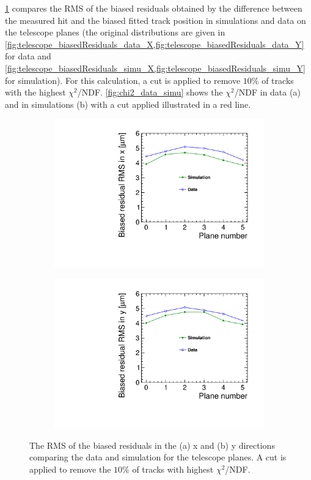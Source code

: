 \cref{fig:telescopeBiasedRMS_data_simu} compares the RMS of the biased
residuals obtained by the difference between the measured hit and the
biased fitted track position in simulations and data on the telescope
planes (the original distributions are given in
\cref{fig:telescope_biasedResiduals_data_X,fig:telescope_biasedResiduals_data_Y}
for data and
\cref{fig:telescope_biasedResiduals_simu_X,fig:telescope_biasedResiduals_simu_Y}
for simulation). For this calculation, a cut is applied to remove
$10\%$ of tracks with the highest
$\chi^2$/NDF. \cref{fig:chi2_data_simu} shows the $\chi^2$/NDF in data
(a) and in simulations (b) with a cut applied illustrated in a red
line.
\begin{figure}[htbp] \centering
  \begin{subfigure}[b]{0.45\textwidth}
    \includegraphics[width=\textwidth]{figures/Telescope/biasedResiduals/RMSX_simu_vs_data.pdf}
    \caption{}
  \end{subfigure}\hfill
  \begin{subfigure}[b]{0.45\textwidth}
    \includegraphics[width=\textwidth]{figures/Telescope/biasedResiduals/RMSY_simu_vs_data.pdf}
    \caption{}
  \end{subfigure}
  \caption{The RMS of the biased residuals in the (a) x and (b) y directions
    comparing the data and simulation for the telescope planes. A cut
    is applied to remove the $10\%$ of tracks with highest
    $\chi^2$/NDF.}
  \label{fig:telescopeBiasedRMS_data_simu}
\end{figure}


